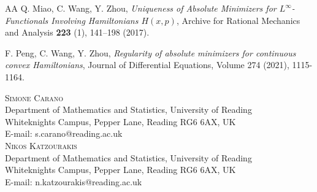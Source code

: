 \documentclass[a4paper,11pt]{article}
\numberwithin{equation}{section}
\theoremstyle{definition}
\begin{document}
\begin{thebibliography}{AA}
 Q. Miao, C. Wang, Y. Zhou, \emph{Uniqueness of Absolute Minimizers for $ L^{\infty}$-Functionals Involving Hamiltonians $H(x,p)$}, Archive for Rational Mechanics and Analysis \textbf{223} (1), 141--198 (2017).

 F. Peng, C. Wang, Y. Zhou, \emph{Regularity of absolute minimizers for continuous convex Hamiltonians}, Journal of Differential Equations, Volume 274 (2021), 1115-1164.







\end{thebibliography}

\vspace{3mm}
\textsc{Simone Carano}\\
Department of Mathematics and Statistics, University of Reading\\
Whiteknights Campus, Pepper Lane, Reading RG6 6AX, UK\\
E-mail: s.carano@reading.ac.uk\\

\textsc{Nikos Katzourakis}\\
Department of Mathematics and Statistics, University of Reading\\
Whiteknights Campus, Pepper Lane, Reading RG6 6AX, UK\\
E-mail: n.katzourakis@reading.ac.uk\\

\end{document}
